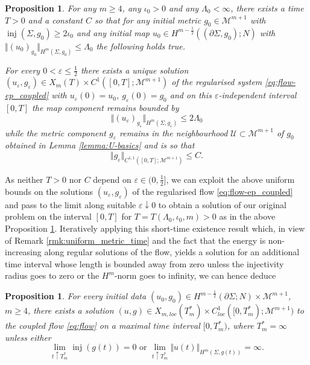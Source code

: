 \documentclass[10pt,reqno]{amsart}
\theoremstyle{plain}
\newtheorem{prop}[lemma]{Proposition}
\theoremstyle{definition}
\numberwithin{equation}{section}
\newcommand{\La}{\Lambda}
\newcommand{\Si}{\Sigma}
\newcommand{\ep}{\varepsilon}
\DeclareMathOperator{\inj}{inj}
\newcommand{\norm}[1]{\Vert#1\Vert}
\newcommand{\beq}{\begin{equation}}
\newcommand{\eeq}{\end{equation}}
\newcommand{\half}{\frac{1}{2}}
\newcommand{\thalf}{\tfrac{1}{2}}
\newcommand{\M}{\ensuremath{{\mathcal M}}}
\newcommand{\eps}{\varepsilon}
\newcommand{\MM}{\mathcal{M}} %
\newcommand{\UU}{{\mathcal U}}
\newcommand{\hf}{\frac{1}{2}} %
\newcommand{\p}{\partial} %
\begin{document}
\begin{prop}\label{prop:ep_system}
    For any $m\ge 4$, any $\iota_0>0$ and any $\La_0<\infty$, there exists a time $T>0$ and a constant $C$ so that for any initial metric $g_0\in\MM^{m+1}$ with $\inj(\Si,g_0)\geq 2\iota_0$ and any initial map $u_0 \in H^{m-\hf}((\p\Si,g_0);N)$ with $\norm{(u_0)_{g_0}}_{H^m(\Si,g_0)}\leq \La_0$ the following holds true. 

    For every $0<\ep\le\hf$ there exists a unique solution $(u_\eps,g_\eps)\in X_m(T)\times C^{1}([0,T];\M^{m+1})$ of the regularised system \eqref{eq:flow-ep_coupled} with $u_\eps(0) = u_0$, $g_\eps(0)=g_0$ and on this $\eps$-\textit{independent} interval $[0,T]$ the map component remains bounded by 
    \beq\label{est:Hm-uniform-prop}
        \norm{(u_\eps)_{g_\eps}}_{H^m(\Si,g_\eps)}\leq 2 \La_0 %
    \eeq
    while the metric component $g_\eps$ %
    remains in the neighbourhood $\UU\subset\MM^{m+1}$ of $g_0$ obtained in Lemma \ref{lemma:U-basics} and is so that 
    \beq\label{est:C11-uniform-prop} 
        \norm{g_\eps}_{C^{1,1}([0,T];\MM^{m+1})}\leq C. %
    \eeq 
\end{prop}


As neither $T>0$ nor $C$ depend on $\eps \in (0,\hf]$, we can exploit the above uniform bounds on the solutions $(u_\eps,g_\eps)$ of the regularised flow \eqref{eq:flow-ep_coupled} and pass to the limit along suitable $\ep\downarrow 0$ to obtain a solution of our original problem on the interval $[0,T]$ for $T=T(\La_0,\iota_0,m)>0$ as in the above Proposition \ref{prop:ep_system}. Iteratively applying this short-time existence result which, 
in view of Remark \ref{rmk:uniform_metric_time} and the fact that the energy is non-increasing along regular solutions of the flow, 
yields a solution for an additional time interval whose length is bounded away from zero 
unless the injectivity radius goes to zero or the $H^m$-norm goes to infinity,
we can hence deduce

\begin{prop}\label{prop:Hm_plateau_existence}
	For every initial data $(u_0,g_0)\in H^{m-\hf}(\p\Si;N)\times \MM^{m+1}$, $m\geq 4$, there exists a solution $(u,g) \in X_{m,loc}(T_m^*)\times C_{loc}^1([0,T_m^*);\MM^{m+1})$ to the coupled flow \eqref{eq:flow} on a maximal time interval $[0,T_m^*)$, where $T_m^*=\infty$ unless either 
	\beq\label{def:Tm*}
		\lim_{t\uparrow T_m^*}\inj(g(t)) = 0 \text{ or } \lim_{t\uparrow T_m^*}\norm{u(t)}_{H^m(\Si,g(t))}=\infty.
	\eeq
\end{prop}
\end{document}
